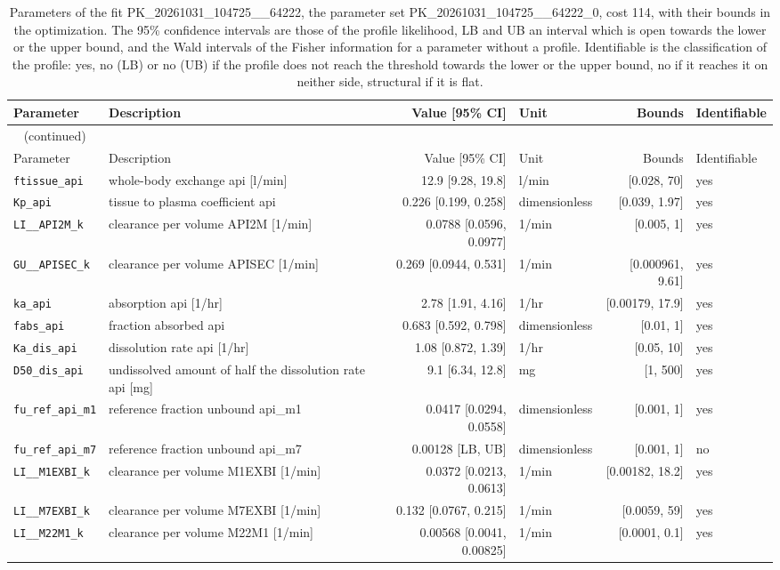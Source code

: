 \documentclass{article}
\begin{document}
\begin{longtable}{llrlrl}
\caption{Parameters of the fit PK\_20261031\_104725\_\_64222, the parameter set PK\_20261031\_104725\_\_64222\_0, cost 114, with their bounds in the optimization. The 95\% confidence intervals are those of the profile likelihood, LB and UB an interval which is open towards the lower or the upper bound, and the Wald intervals of the Fisher information for a parameter without a profile. Identifiable is the classification of the profile: yes, no (LB) or no (UB) if the profile does not reach the threshold towards the lower or the upper bound, no if it reaches it on neither side, structural if it is flat.}\label{tab:parameters:PK_20261031_104725__64222} \\
\toprule
Parameter & Description & Value [95\% CI] & Unit & Bounds & Identifiable \\
\midrule
\endfirsthead
\multicolumn{6}{l}{\small\tablename~\thetable{} (continued)} \\
\toprule
Parameter & Description & Value [95\% CI] & Unit & Bounds & Identifiable \\
\midrule
\endhead
\bottomrule
\endlastfoot
\texttt{ftissue\_api} & whole-body exchange api [l/min] & 12.9 [9.28, 19.8] & l/min & [0.028, 70] & yes \\
\texttt{Kp\_api} & tissue to plasma coefficient api & 0.226 [0.199, 0.258] & dimensionless & [0.039, 1.97] & yes \\
\texttt{LI\_\_API2M\_k} & clearance per volume API2M [1/min] & 0.0788 [0.0596, 0.0977] & 1/min & [0.005, 1] & yes \\
\texttt{GU\_\_APISEC\_k} & clearance per volume APISEC [1/min] & 0.269 [0.0944, 0.531] & 1/min & [0.000961, 9.61] & yes \\
\texttt{ka\_api} & absorption api [1/hr] & 2.78 [1.91, 4.16] & 1/hr & [0.00179, 17.9] & yes \\
\texttt{fabs\_api} & fraction absorbed api & 0.683 [0.592, 0.798] & dimensionless & [0.01, 1] & yes \\
\texttt{Ka\_dis\_api} & dissolution rate api [1/hr] & 1.08 [0.872, 1.39] & 1/hr & [0.05, 10] & yes \\
\texttt{D50\_dis\_api} & undissolved amount of half the dissolution rate api [mg] & 9.1 [6.34, 12.8] & mg & [1, 500] & yes \\
\texttt{fu\_ref\_api\_m1} & reference fraction unbound api\_m1 & 0.0417 [0.0294, 0.0558] & dimensionless & [0.001, 1] & yes \\
\texttt{fu\_ref\_api\_m7} & reference fraction unbound api\_m7 & 0.00128 [LB, UB] & dimensionless & [0.001, 1] & no \\
\texttt{LI\_\_M1EXBI\_k} & clearance per volume M1EXBI [1/min] & 0.0372 [0.0213, 0.0613] & 1/min & [0.00182, 18.2] & yes \\
\texttt{LI\_\_M7EXBI\_k} & clearance per volume M7EXBI [1/min] & 0.132 [0.0767, 0.215] & 1/min & [0.0059, 59] & yes \\
\texttt{LI\_\_M22M1\_k} & clearance per volume M22M1 [1/min] & 0.00568 [0.0041, 0.00825] & 1/min & [0.0001, 0.1] & yes \\
\end{longtable}
\end{document}

